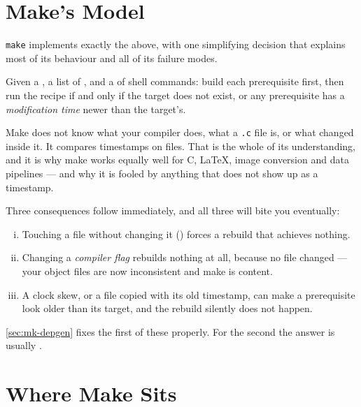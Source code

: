 \section{Make's Model}\label{sec:mk-model}

\texttt{make} implements exactly the above, with one simplifying decision that
explains most of its behaviour and all of its failure modes.

\begin{definition}
	Given a , a list of , and a 
	of shell commands: build each prerequisite first, then run the recipe if and
	only if the target does not exist, or any prerequisite has a
	\emph{modification time} newer than the target's.
\end{definition}

\begin{intuition}
	Make does not know what your compiler does, what a \texttt{.c} file is, or what
	changed inside it. It compares timestamps on files. That is the whole of its
	understanding, and it is why make works equally well for C, \LaTeX{}, image
	conversion and data pipelines --- and why it is fooled by anything that does
	not show up as a timestamp.
\end{intuition}

\begin{note}
	Three consequences follow immediately, and all three will bite you eventually:
	\begin{enumerate}[(i)]
		\item Touching a file without changing it () forces a rebuild
		      that achieves nothing.
		\item Changing a \emph{compiler flag} rebuilds nothing at all, because no file
		      changed --- your object files are now inconsistent and make is content.
		\item A clock skew, or a file copied with its old timestamp, can make a
		      prerequisite look older than its target, and the rebuild silently does not
		      happen.
	\end{enumerate}
	\autoref{sec:mk-depgen} fixes the first of these properly. For the second the
	answer is usually .
\end{note}

\section{Where Make Sits}\label{sec:mk-alt}

